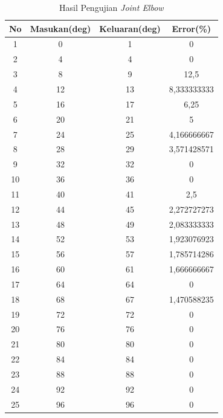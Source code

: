  \begin{table}[]
 	
 	\small
 	\centering
 	\caption{Hasil Pengujian \textit{Joint Elbow}}
 	\label{tbl.jointelbow}
 	\begin{tabular}{|c|c|c|c|}
 		\hline
 		\rowcolor[HTML]{9B9B9B} 
 		No & Masukan(deg) & Keluaran(deg) & Error(\%)      \\ \hline
 		1  & 0       & 1        & 0           \\ \hline
 		2  & 4       & 4        & 0           \\ \hline
 		3  & 8       & 9        & 12,5        \\ \hline
 		4  & 12      & 13       & 8,333333333 \\ \hline
 		5  & 16      & 17       & 6,25        \\ \hline
 		6  & 20      & 21       & 5           \\ \hline
 		7  & 24      & 25       & 4,166666667 \\ \hline
 		8  & 28      & 29       & 3,571428571 \\ \hline
 		9  & 32      & 32       & 0           \\ \hline
 		10 & 36      & 36       & 0           \\ \hline
 		11 & 40      & 41       & 2,5         \\ \hline
 		12 & 44      & 45       & 2,272727273 \\ \hline
 		13 & 48      & 49       & 2,083333333 \\ \hline
 		14 & 52      & 53       & 1,923076923 \\ \hline
 		15 & 56      & 57       & 1,785714286 \\ \hline
 		16 & 60      & 61       & 1,666666667 \\ \hline
 		17 & 64      & 64       & 0           \\ \hline
 		18 & 68      & 67       & 1,470588235 \\ \hline
 		19 & 72      & 72       & 0           \\ \hline
 		20 & 76      & 76       & 0           \\ \hline
 		21 & 80      & 80       & 0           \\ \hline
 		22 & 84      & 84       & 0           \\ \hline
 		23 & 88      & 88       & 0           \\ \hline
 		24 & 92      & 92       & 0           \\ \hline
 		25 & 96      & 96       & 0           \\ \hline

\end{tabular}
\end{table}
